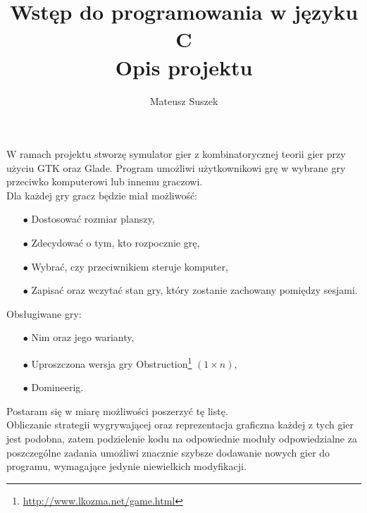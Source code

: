 \documentclass[a4paper]{article}
\author{Mateusz Suszek}
\title{Wstęp do programowania w języku C \\ Opis projektu}
\date{}
\begin{document}
	
\Large{
	
	\maketitle
	
	\thispagestyle{empty}
	
	W ramach projektu stworzę symulator gier z kombinatorycznej teorii gier przy użyciu GTK oraz Glade.
	Program umożliwi użytkownikowi grę w wybrane gry przeciwko komputerowi lub innemu graczowi. \\
	
	Dla każdej gry gracz będzie miał możliwość:
	\begin{enumerate}
		\item[$\bullet$] Dostosować rozmiar planszy,
		\item[$\bullet$] Zdecydować o tym, kto rozpocznie grę,
		\item[$\bullet$] Wybrać, czy przeciwnikiem steruje komputer,
		\item[$\bullet$] Zapisać oraz wczytać stan gry, który zostanie zachowany pomiędzy sesjami.\\
	\end{enumerate}
	 
	Obsługiwane gry:
	
	\begin{enumerate}
		\item[$\bullet$] Nim oraz jego warianty,
		\item[$\bullet$] Uproszczona wersja gry Obstruction\footnote{\url{http://www.lkozma.net/game.html}} $(1\times n)$,
		\item[$\bullet$] Domineerig.
	\end{enumerate}
	Postaram się w miarę możliwości poszerzyć tę listę.\\
	
	Obliczanie strategii wygrywającej oraz reprezentacja graficzna każdej z tych gier jest podobna, zatem podzielenie kodu na odpowiednie moduły odpowiedzialne za poszczególne zadania umożliwi znacznie szybsze dodawanie nowych gier do programu, wymagające jedynie niewielkich modyfikacji.
	
	

}
\end{document}
